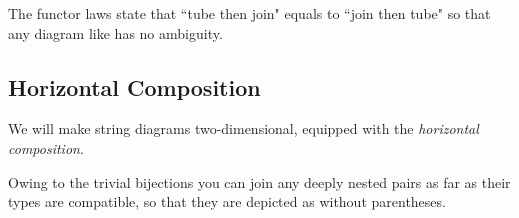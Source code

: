 \documentclass{article}
\begin{document}
The functor laws state that ``tube then join" equals to ``join then tube" so that %
any diagram like
has no ambiguity.


\subsection{Horizontal Composition}

We will make string diagrams two-dimensional, equipped with the \emph{horizontal composition}.

Owing to the trivial bijections
you can join any deeply nested pairs as far as their types are compatible, so that they are depicted as
without parentheses.



\end{document}

